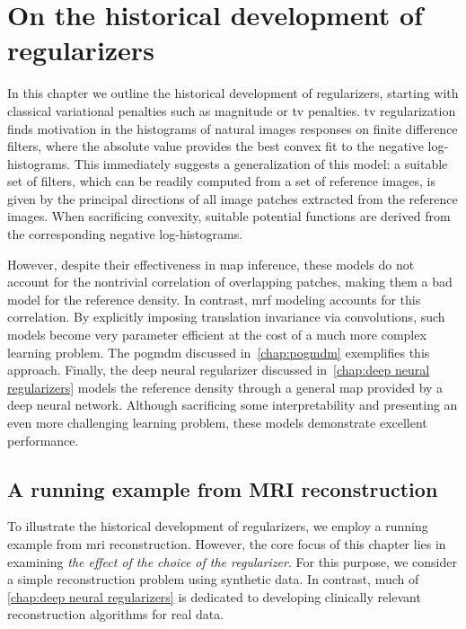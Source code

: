 \chapter{On the historical development of regularizers}%
\label{chap:regularizers}%
\graphicspath{{chapters/regularizers/scripts}}%
In this chapter we outline the historical development of regularizers, starting with classical variational penalties such as magnitude or \gls{tv} penalties.
\gls{tv} regularization finds motivation in the histograms of natural images responses on finite difference filters, where the absolute value provides the best convex fit to the negative log-histograms.
This immediately suggests a generalization of this model:
a suitable set of filters, which can be readily computed from a set of reference images, is given by the principal directions of all image patches extracted from the reference images.
When sacrificing convexity, suitable potential functions are derived from the corresponding negative log-histograms.

However, despite their effectiveness in \gls{map} inference, these models do not account for the nontrivial correlation of overlapping patches, making them a bad model for the reference density.
In contrast, \gls{mrf} modeling accounts for this correlation.
By explicitly imposing translation invariance via convolutions, such models become very parameter efficient at the cost of a much more complex learning problem.
The \gls{pogmdm} discussed in~\cref{chap:pogmdm} exemplifies this approach.
Finally, the deep neural regularizer discussed in~\cref{chap:deep neural regularizers} models the reference density through a general map provided by a deep neural network.
Although sacrificing some interpretability and presenting an even more challenging learning problem, these models demonstrate excellent performance.

\section{A running example from MRI reconstruction}
To illustrate the historical development of regularizers, we employ a running example from \gls{mri} reconstruction.
However, the core focus of this chapter lies in examining \emph{the effect of the choice of the regularizer}.
For this purpose, we consider a simple reconstruction problem using synthetic data.
In contrast, much of \cref{chap:deep neural regularizers} is dedicated to developing clinically relevant reconstruction algorithms for real data.

